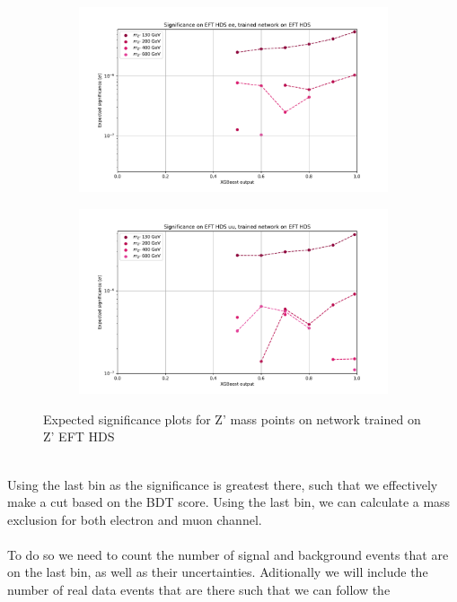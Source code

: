 \documentclass[12pt, a4paper]{book}
\begin{document}
\begin{figure}[!ht]
	\centering
	\begin{subfigure}[b]{0.49\textwidth}
      \centering
      \includegraphics[width=1\textwidth]{XGBoost/EFT_HDS/EXP_SIG_ee.pdf}
      \end{subfigure}
   \hfill
   \begin{subfigure}[b]{0.49\textwidth}
      \centering
      \includegraphics[width=1\textwidth]{XGBoost/EFT_HDS/EXP_SIG_uu.pdf}
      \end{subfigure}
   \caption{Expected significance plots for Z' mass points on network trained on Z' EFT HDS}\label{fig:EFT_HDS_exp_sig}
\end{figure}
\\Using the last bin as the significance is greatest there, such that we effectively make a cut based on the BDT score. Using the last bin, we can calculate a mass exclusion for both electron and muon channel.\\
\\To do so we need to count the number of signal and background events that are on the last bin, as well as their uncertainties. Aditionally we will include the number of real data events that are there such that we can follow the 
\end{document}
